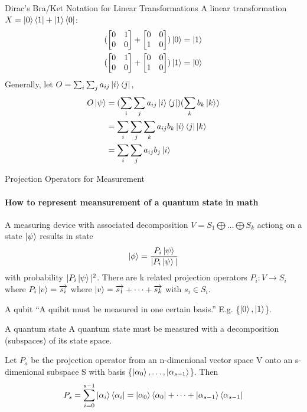 \documentclass{beamer}
\begin{document}
\begin{frame}{Dirac's Bra/Ket Notation for Linear Transformations}
{  A linear transformation $X=\ket{0}\bra{1} + \ket{1}\bra{0}$:
    \begin{align*}
      (\begin{bmatrix}
       0 & 1 \\
       0 & 0
       \end{bmatrix}
       + 
       \begin{bmatrix}
       0 & 0 \\
       1 & 0
       \end{bmatrix}) \ket{0} = \ket{1} \\
      (\begin{bmatrix}
       0 & 1 \\
       0 & 0
       \end{bmatrix}
       + 
       \begin{bmatrix}
       0 & 0 \\
       1 & 0
       \end{bmatrix}) \ket{1} = \ket{0}
    \end{align*}
  Generally, let $O = \sum_{i}\sum_{j}a_{ij}\ket{i}\bra{j}$,
    \begin{align*}
      O\ket{\psi} &= (\sum_{i}\sum_{j}a_{ij}\ket{i}\bra{j}) (\sum_{k}b_{k}\ket{k}) \\
                  &= \sum_{i}\sum_{j}\sum_{k} a_{ij}b_{k}\ket{i}\bra{j}\ket{k} \\
                  &= \sum_{i}\sum_{j}a_{ij}b_{j}\ket{i}
    \end{align*}
  }%
\end{frame}

\begin{frame}{Projection Operators for Measurement}
  \framesubtitle{How to represent meansurement of a quantum state in math}
  {\tiny
    A measuring device with associated decomposition $V=S_1 \bigoplus \dots \bigoplus S_k$ actiong on a state $\ket{\psi}$ results in state
    \begin{align*}
      \ket{\phi} = \frac {P_i\ket{\psi}} {|P_i\ket{\psi}|}
    \end{align*}
    with probability $|P_i\ket{\psi}|^2$.
    There are k related projection operators $P_i: V \rightarrow S_i$ where $P_i\ket{v}=\overrightarrow{s_i}$ where $\ket{v} = \overrightarrow{s_1} + \dots + \overrightarrow{s_k}$ with $s_i \in S_i$.
  \begin{block}{A qubit}
    “A quibit must be measured in one certain basis.” E.g. \{$\ket0, \ket1$\}.
  \end{block}
  \begin{block}{A quantum state}
    A quantum state must be measured with a decomposition (subspaces) of its state space.
  \end{block}
  Let $P_s$ be the projection operator from an n-dimenional vector space V onto an s-dimenional subspace S with basis \{$\ket{\alpha_0}, \dots, \ket{\alpha_{s-1}}$\}. Then
  \begin{align*}
    P_s = \sum^{s-1}_{i=0} \ket{\alpha_i} \bra{\alpha_i} = \ket{\alpha_0}\bra{\alpha_0} + \dots + \ket{\alpha_{s-1}}\bra{\alpha_{s-1}}
  \end{align*}
  }%
\end{frame}
\end{document}
